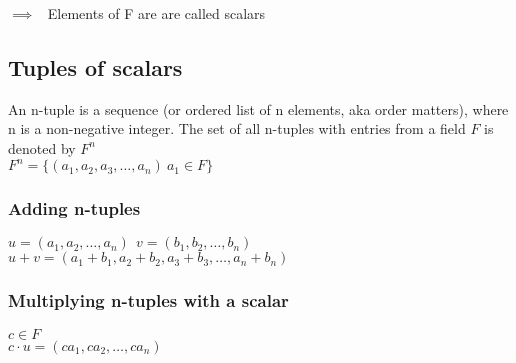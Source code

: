 \documentclass[a4paper]{article}
\begin{document}
$\implies$ \ Elements of F are are called scalars

\subsection{Tuples of scalars}
An n-tuple is a sequence (or ordered list of n elements, aka order matters), where n is a non-negative integer. The set of all n-tuples with entries from a field $F$ is denoted by $F^n$\\
$F^n = \{(a_1, a_2, a_3, \dots, a_n) \ a_1 \in F\}$
\subsubsection{Adding n-tuples}
$u = (a_1, a_2,\dots, a_n) \ \ v = (b_1, b_2,\dots, b_n) $\\
$u + v = (a_1 + b_1, a_2 + b_2, a_3 + b_3, \dots, a_n + b_n)$
\subsubsection{Multiplying n-tuples with a scalar}
$c \in F$\\
$c \cdot u = (ca_1, ca_2,\dots, ca_n) $
\end{document}

